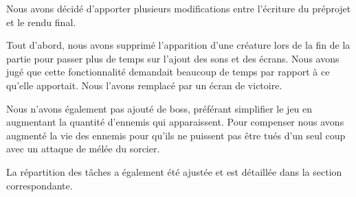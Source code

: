 Nous avons décidé d'apporter plusieurs modifications entre l'écriture du préprojet et le rendu final. 

Tout d'abord, nous avons supprimé l'apparition d'une créature lors de la fin de la partie pour passer plus de temps sur l'ajout des sons et des écrans. Nous avons jugé que cette fonctionnalité demandait beaucoup de temps par rapport à ce qu'elle apportait. Nous l'avons remplacé par un écran de victoire.

Nous n'avons également pas ajouté de boss, préférant simplifier le jeu en augmentant la quantité d'ennemis qui apparaissent. Pour compenser nous avons augmenté la vie des ennemis pour qu'ils ne puissent pas être tués d'un seul coup avec un attaque de mélée du sorcier.

La répartition des tâches a également été ajustée et est détaillée dans la section correspondante.
